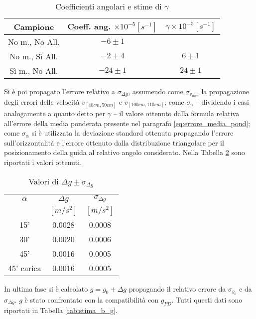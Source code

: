 \documentclass[a4paper,11pt,oneside]{article}
\begin{document}
\begin{table}[h!]
\centering
\begin{tabular}{c|c|c}
    \toprule
        Campione & Coeff. ang. $\times 10^{-5} [\si{s^{-1}}]$ & $\gamma \times 10^{-5} [\si{s^{-1}}]$\\
    \midrule
        No m., No All. &  $-6 \pm 1$ & \\ 
        No m., Sì All. & $-2 \pm 4$ & \multirow{-2}{*}{   $6 \pm 1$} \\
        \hline
        Sì m., No All. &  $-24 \pm 1$ & $24 \pm 1$\\
     \bottomrule
\end{tabular}
    \caption{Coefficienti angolari e stime di $\gamma$}
    \label{tab:stime_di_gamma}
\end{table}

Si è poi propagato l'errore relativo a $\sigma_{\Delta g}$, assumendo come $\sigma_{v_{med}}$ la propagazione degli errori delle velocità $v_{[40cm,50cm]}$ e $v_{[100cm,110cm]}$; come $\sigma_{\gamma}$ -- dividendo i casi analogamente a quanto detto per $\gamma$ -- il valore ottenuto dalla formula relativa all'errore della media ponderata presente nel paragrafo \ref{eq:errore_media_pond}; come $\sigma_{\alpha}$ si è utilizzata la deviazione standard ottenuta propagando l'errore sull'orizzontalità e l'errore ottenuto dalla distribuzione triangolare per il posizionamento della guida al relativo angolo considerato. Nella Tabella \ref{tab:deltag} sono riportati i valori ottenuti.


\begin{table}[h!]%
    \centering
    \begin{tabular}{c|c|c}
        \toprule
        $\alpha$ & $\Delta g$ & $\sigma_{\Delta g}$ \\
        &$[\si{m/s^2}]$&$[\si{m/s^2}]$\\
        
    \midrule
    15' & 0.0028 & 0.0008 \\ 
    30' & 0.0020 & 0.0006 \\
    45' & 0.0016 & 0.0005 \\
    45' carica & 0.0016 & 0.0005 \\
 \bottomrule
    \end{tabular}
    \caption{Valori di $\Delta g \pm \sigma_{\Delta g}$}
    \label{tab:deltag}
\end{table}

In ultima fase si è calcolato $g=g_0 + \Delta g$ propagando il relativo errore da $\sigma_{g_{0}}$ e da $\sigma_{\Delta g}$. $g$ è stato confrontato con la compatibilità con $g_{PD}$. Tutti questi dati sono riportati in Tabella \ref{tab:stima_b_g}.\\
\end{document}
